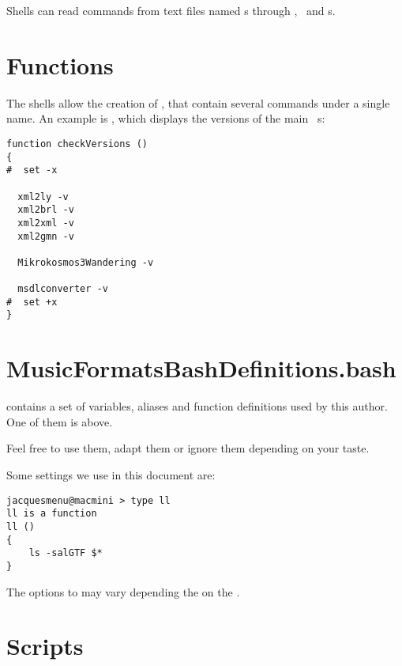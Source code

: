 Shells can read commands from text files named s through , \outputRedirection\ and \pipe s.


\section{Functions}

The shells allow the creation of , that contain several commands under a single name. An example is , which displays the versions of the main \mf\ \service s:
\begin{lstlisting}[language=Terminal]
function checkVersions ()
{
#  set -x

  xml2ly -v
  xml2brl -v
  xml2xml -v
  xml2gmn -v

  Mikrokosmos3Wandering -v

  msdlconverter -v
#  set +x
}
\end{lstlisting}


\section{MusicFormatsBashDefinitions.bash}

 contains a set of variables, aliases and function definitions used by this author. One of them is  above.

Feel free to use them, adapt them or ignore them depending on your taste.

Some settings we use in this document are:
\begin{lstlisting}[language=Terminal]
jacquesmenu@macmini > type ll
ll is a function
ll () 
{ 
    ls -salGTF $*
}
\end{lstlisting}
The options to  may vary depending the on the \OS.

\section{Scripts}

